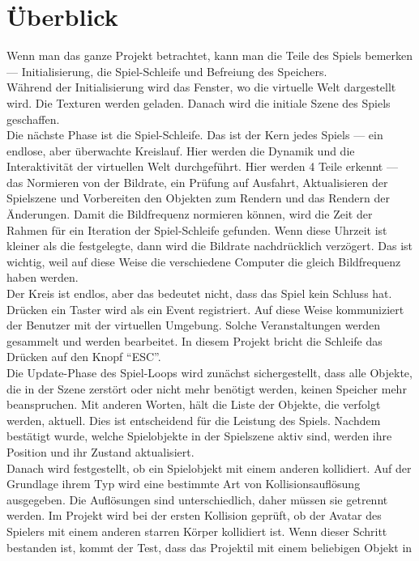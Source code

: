 \documentclass[
  10pt,
  a4paper,
  oneside,
  headers,
  headinclude,
  footinclude,
  BCOR5mm,
]{article}
\begin{document}
\section{Überblick}
Wenn man das ganze Projekt betrachtet, kann man die Teile des Spiels bemerken
--- Initialisierung, die Spiel-Schleife und Befreiung des Speichers.\\
Während der Initialisierung wird das Fenster, wo die virtuelle Welt dargestellt
wird. Die Texturen werden geladen. Danach wird die initiale Szene des Spiels
geschaffen.\\
Die nächste Phase ist die Spiel-Schleife. Das ist der Kern jedes Spiels --- ein
endlose, aber überwachte Kreislauf. Hier werden die Dynamik und die
Interaktivität der virtuellen Welt durchgeführt. Hier werden 4 Teile erkennt
--- das Normieren von der Bildrate, ein Prüfung auf Ausfahrt, Aktualisieren der
Spielszene und Vorbereiten den Objekten zum Rendern und das Rendern der
Änderungen. Damit die Bildfrequenz normieren können, wird die Zeit der Rahmen
für ein Iteration der Spiel-Schleife gefunden. Wenn diese Uhrzeit ist kleiner
als die festgelegte, dann wird die Bildrate nachdrücklich verzögert. Das ist
wichtig, weil auf diese Weise die verschiedene Computer die gleich Bildfrequenz
haben werden.\\
Der Kreis ist endlos, aber das bedeutet nicht, dass das Spiel kein Schluss hat.
Drücken ein Taster wird als ein Event registriert. Auf diese Weise kommuniziert
der Benutzer mit der virtuellen Umgebung. Solche Veranstaltungen werden
gesammelt und werden bearbeitet. In diesem Projekt bricht die Schleife das
Drücken auf den Knopf ``ESC''.\\
Die Update-Phase des Spiel-Loops wird zunächst sichergestellt, dass alle
Objekte, die in der Szene zerstört oder nicht mehr benötigt werden, keinen
Speicher mehr beanspruchen. Mit anderen Worten, hält die Liste der Objekte, die
verfolgt werden, aktuell. Dies ist entscheidend für die Leistung des Spiels.
Nachdem bestätigt wurde, welche Spielobjekte in der Spielszene aktiv sind,
werden ihre Position und ihr Zustand aktualisiert.\\
Danach wird festgestellt, ob ein Spielobjekt mit einem anderen kollidiert. Auf
der Grundlage ihrem Typ wird eine bestimmte Art von Kollisionsauflösung
ausgegeben. Die Auflösungen sind unterschiedlich, daher müssen sie getrennt
werden. Im Projekt wird bei der ersten Kollision geprüft, ob der Avatar des
Spielers mit einem anderen starren Körper kollidiert ist. Wenn dieser Schritt
bestanden ist, kommt der Test, dass das Projektil mit einem beliebigen Objekt in
\end{document}
